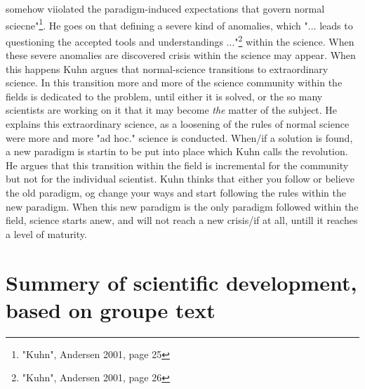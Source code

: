 \documentclass[paper=a4, fontsize=11pt]{scrartcl} %
\numberwithin{equation}{section} %
\numberwithin{figure}{section} %
\numberwithin{table}{section} %
\begin{document}
somehow viiolated the paradigm-induced expectations that govern normal sciecne"\footnote{"Kuhn", Andersen 2001, page 25}. He goes on that defining a severe kind of anomalies, which "... leads to questioning the accepted tools and understandings ..."\footnote{"Kuhn", Andersen 2001, page 26} within the science. When these severe anomalies are discovered crisis within the science may appear. When this happens Kuhn argues that normal-science transitions to extraordinary science. In this transition more and more of the science community within the fields is dedicated to the problem, until either it is solved, or the so many scientists are working on it that it may become \textit{the} matter of the subject. He explains this extraordinary science, as a loosening of the rules of normal science were more and more "ad hoc." science is conducted. When/if a solution is found, a new paradigm is startin to be put into place which Kuhn calls the revolution. He argues that this transition within the field is incremental for the community but not for the individual scientist. Kuhn thinks that either you follow or believe the old paradigm, og change your ways and start following the rules within the new paradigm. When this new paradigm is the only paradigm followed within the field, science starts anew, and will not reach a new crisis/if at all, untill it reaches a level of maturity.
	
	
	\section{Summery of scientific development, based on groupe text}
	
\end{document}
